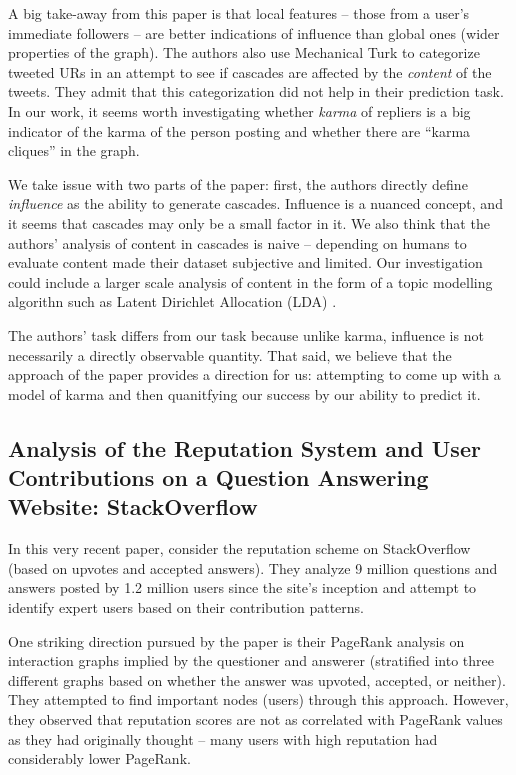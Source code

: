 \documentclass[10pt]{article}
\begin{document}
A big take-away from this paper is that local features -- those from a user's
immediate followers -- are better indications of influence than global ones
(wider properties of the graph). The authors also use Mechanical Turk to
categorize tweeted URs in an attempt to see if cascades are affected by the
\textit{content} of the tweets. They admit that this categorization did not help
in their prediction task. In our work, it seems worth investigating whether
\textit{karma} of repliers is a big indicator of the karma of the person posting
and whether there are ``karma cliques'' in the graph.

We take issue with two parts of the paper: first, the authors directly define
\textit{influence} as the ability to generate cascades. Influence is a nuanced
concept, and it seems that cascades may only be a small factor in it. We also
think that the authors' analysis of content in cascades is naive -- depending on
humans to evaluate content made their dataset subjective and limited.  Our
investigation could include a larger scale analysis of content in the form of a
topic modelling algorithn such as Latent Dirichlet Allocation (LDA)
\citep{blei2003latent}.

The authors' task differs from our task because unlike karma, influence is not
necessarily a directly observable quantity. That said, we believe that the
approach of the paper provides a direction for us: attempting to come up with a
model of karma and then quanitfying our success by our ability to predict it.

\subsection{Analysis of the Reputation System and User Contributions on a
  Question Answering Website: StackOverflow
  \citep{movshovitzanalysis}}

In this very recent paper, \citet{movshovitzanalysis} consider the reputation
scheme on StackOverflow (based on upvotes and accepted answers). They analyze 9
million questions and answers posted by 1.2 million users since the site's
inception and attempt to identify expert users based on their contribution
patterns.

One striking direction pursued by the paper is their PageRank analysis on
interaction graphs implied by the questioner and answerer (stratified into three
different graphs based on whether the answer was upvoted, accepted, or neither).
They attempted to find important nodes (users) through this approach. However,
they observed that reputation scores are not as correlated with PageRank values
as they had originally thought -- many users with high reputation had
considerably lower PageRank.
\end{document}
